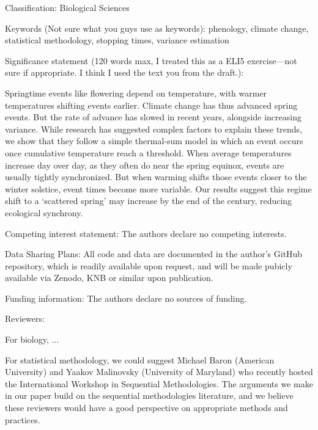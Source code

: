  Classification: Biological Sciences


Keywords (Not sure what you guys use as keywords): 
phenology, climate change, statistical methodology, stopping times, variance estimation

Significance statement (120 words max, I treated this as a ELI5 exercise—not sure if appropriate. I think I used the text you from the draft.):

Springtime events like flowering depend on temperature, with warmer temperatures shifting events earlier. Climate change has thus advanced spring events. But the rate of advance has slowed in recent years, alongside increasing variance. While research has suggested complex factors to explain these trends, we show that they follow a simple thermal-sum model in which an event occurs once cumulative temperature reach a threshold. When average temperatures increase day over day, as they often do near the spring equinox, events are usually tightly synchronized. But when warming shifts those events closer to the winter solstice, event times become more variable. Our results suggest this regime shift to a `scattered spring' may increase by the end of the century, reducing ecological synchrony. 

Competing interest statement: The authors declare no competing interests. 

Data Sharing Plans: All code and data are documented in the author's GitHub repository, which is readily available upon request, and will be made pubicly available via Zenodo, KNB or similar upon publication. %

Funding information: The authors declare no sources of funding.

Reviewers:

For biology, ...

For statistical methodology, we could suggest Michael Baron (American University) and Yaakov Malinovsky (University of Maryland) who recently hosted the International Workshop in Sequential Methodologies. The arguments we make in our paper build on the sequential methodologies literature, and we believe these reviewers would have a good perspective on appropriate methods and practices. %

